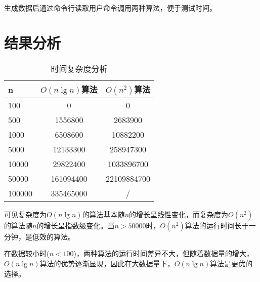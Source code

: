 \documentclass[a4paper,9pt]{article}
\begin{document}
生成数据后通过命令行读取用户命令调用两种算法，便于测试时间。

\section{结果分析}
\begin{table}[!htp]
    \centering
    \caption{时间复杂度分析}
    \begin{tabular}{l|c|c}
        \hline
        n  & $O(n\lg n)$算法 & $O(n^2)$算法\\
        \hline
        100 & 0 & 0 \\
        \hline
        500 & 1556800 & 2683900 \\
        \hline
        1000 & 6508600 & 10882200 \\
        \hline
        5000 & 12133300 & 258947300 \\
        \hline
        10000 & 29822400 & 1033896700 \\
        \hline
        50000 & 161094400  & 22109884700 \\
        \hline
        100000 & 335465000 & / \\
        \hline
    \end{tabular}
\end{table}
可见复杂度为$O(n\lg n)$的算法基本随$n$的增长呈线性变化，而复杂度为$O(n^2)$的算法随$n$的增长呈指数级变化。当$n>50000$时，$O(n^2)$算法的运行时间长于一分钟，是低效的算法。

在数据较小时($n<100$)，两种算法的运行时间差异不大，但随着数据量的增大，$O(n\lg n)$算法的优势逐渐显现，因此在大数据量下，$O(n\lg n)$算法是更优的选择。
\end{document}
